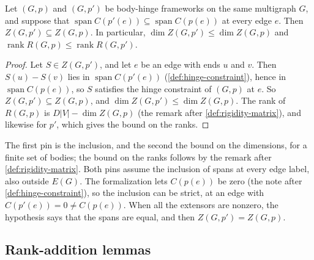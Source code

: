 \begin{lemma}
  \label{lem:rank-rotation-semicont}
  \leanok
  Let $(G,p)$ and $(G,p')$ be body-hinge frameworks on the same
  multigraph $G$, and suppose that
  $\operatorname{span} C(p'(e)) \subseteq \operatorname{span} C(p(e))$
  at every edge $e$. Then $Z(G,p') \subseteq Z(G,p)$. In particular,
  $\dim Z(G,p') \le \dim Z(G,p)$ and
  $\operatorname{rank} R(G,p) \le \operatorname{rank} R(G,p')$.
\end{lemma}
\begin{proof}
  \leanok
  Let $S \in Z(G,p')$, and let $e$ be an edge with ends $u$ and $v$.
  Then $S(u) - S(v)$ lies in $\operatorname{span} C(p'(e))$
  (\cref{def:hinge-constraint}), hence in
  $\operatorname{span} C(p(e))$, so $S$ satisfies the hinge constraint
  of $(G,p)$ at $e$. So $Z(G,p') \subseteq Z(G,p)$, and
  $\dim Z(G,p') \le \dim Z(G,p)$. The rank of $R(G,p)$ is
  $D|V| - \dim Z(G,p)$ (the remark after \cref{def:rigidity-matrix}),
  and likewise for $p'$, which gives the bound on the ranks.
\end{proof}
\begin{fmlnote}
  The first pin is the inclusion, and the second the bound on the
  dimensions, for a finite set of bodies; the bound on the ranks follows
  by the remark after \cref{def:rigidity-matrix}. Both pins assume the
  inclusion of spans at every edge label, also outside $E(G)$. The
  formalization lets $C(p(e))$ be zero (the note after
  \cref{def:hinge-constraint}), so the inclusion can be strict, at an
  edge with $C(p'(e)) = 0 \neq C(p(e))$. When all the extensors are
  nonzero, the hypothesis says that the spans are equal, and then
  $Z(G,p') = Z(G,p)$.
\end{fmlnote}

\subsection{Rank-addition lemmas}
\label{sec:molecular-rigidity-matrix-blocks}

